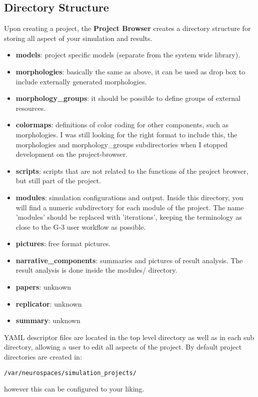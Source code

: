 \documentclass[12pt]{article}
\begin{document}
\subsection*{Directory Structure}

Upon creating a project, the {\bf Project Browser} creates a directory structure for storing all aspect of your simulation and results. 

\begin{itemize}
\item[] {\bf models}: project specific models (separate from the system wide library).

\item[] {\bf morphologies}: basically the same as above, it can be used as drop box to include externally generated morphologies.

\item[] {\bf morphology\_groups}: it should be possible to define groups of external resources.

\item[] {\bf colormaps}: definitions of color coding for other components, such as morphologies.  I was still looking for the right format to include this, the morphologies and morphology\_groups subdirectories when I stopped development on the project-browser.

\item[] {\bf scripts}: scripts that are not related to the functions of the project browser, but still part of the project.

\item[] {\bf modules}: simulation configurations and output. Inside this directory, you will find a numeric subdirectory for each module of the project. The name 'modules' should be replaced with 'iterations', keeping the terminology as close to the G-3 user workflow as possible.

\item[] {\bf pictures}: free format pictures.

\item[] {\bf narrative\_components}: summaries and pictures of result analysis.  The result analysis is done inside the modules/ directory.

\item[] {\bf papers}: unknown

\item[] {\bf replicator}: unknown 

\item[] {\bf summary}: unknown

\end{itemize}

YAML descriptor files are located in the top level directory as well as in each sub directory, allowing a user to edit all aspects of the project. By default project directories are created in:

\begin{verbatim}
/var/neurospaces/simulation_projects/
\end{verbatim}

however this can be configured to your liking.
\end{document}
